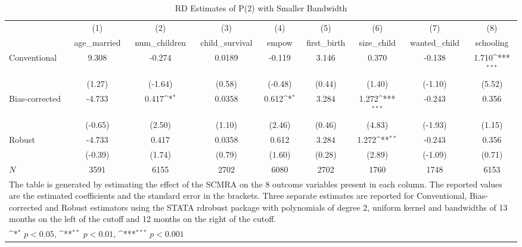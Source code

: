 \begin{table}[htbp]\centering
\def\sym#1{\ifmmode^{#1}\else\(^{#1}\)\fi}
\caption{RD Estimates of P(2) with Smaller Bandwidth}
\begin{tabular}{l*{8}{c}}
\toprule
            &\multicolumn{1}{c}{(1)}&\multicolumn{1}{c}{(2)}&\multicolumn{1}{c}{(3)}&\multicolumn{1}{c}{(4)}&\multicolumn{1}{c}{(5)}&\multicolumn{1}{c}{(6)}&\multicolumn{1}{c}{(7)}&\multicolumn{1}{c}{(8)}\\
            &\multicolumn{1}{c}{age\_married}&\multicolumn{1}{c}{num\_children}&\multicolumn{1}{c}{child\_survival}&\multicolumn{1}{c}{empow}&\multicolumn{1}{c}{first\_birth}&\multicolumn{1}{c}{size\_child}&\multicolumn{1}{c}{wanted\_child}&\multicolumn{1}{c}{schooling}\\
\midrule
Conventional&       9.308         &      -0.274         &      0.0189         &      -0.119         &       3.146         &       0.370         &      -0.138         &       1.710\sym{***}\\
            &      (1.27)         &     (-1.64)         &      (0.58)         &     (-0.48)         &      (0.44)         &      (1.40)         &     (-1.10)         &      (5.52)         \\
\addlinespace
Bias-corrected&      -4.733         &       0.417\sym{*}  &      0.0358         &       0.612\sym{*}  &       3.284         &       1.272\sym{***}&      -0.243         &       0.356         \\
            &     (-0.65)         &      (2.50)         &      (1.10)         &      (2.46)         &      (0.46)         &      (4.83)         &     (-1.93)         &      (1.15)         \\
\addlinespace
Robust      &      -4.733         &       0.417         &      0.0358         &       0.612         &       3.284         &       1.272\sym{**} &      -0.243         &       0.356         \\
            &     (-0.39)         &      (1.74)         &      (0.79)         &      (1.60)         &      (0.28)         &      (2.89)         &     (-1.09)         &      (0.71)         \\
\midrule
\(N\)       &        3591         &        6155         &        2702         &        6080         &        2702         &        1760         &        1748         &        6153         \\
\bottomrule
\multicolumn{9}{l}{\footnotesize The table is generated by estimating the effect of the SCMRA on the 8 outcome variables present in each column. The reported values are the estimated coefficients and the standard error in the brackets. Three separate estimates are reported for Conventional, Bias-corrected and Robust estimators using the STATA rdrobust package with polynomials of degree 2, uniform kernel and bandwidths of 13 months on the left of the cutoff and 12 months on the right of the cutoff.}\\
\multicolumn{9}{l}{\footnotesize \sym{*} \(p<0.05\), \sym{**} \(p<0.01\), \sym{***} \(p<0.001\)}\\
\end{tabular}
\end{table}

